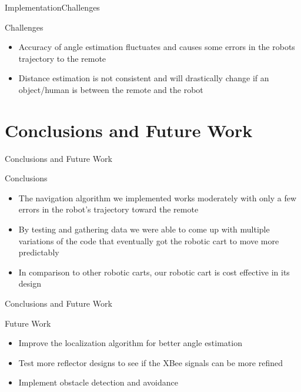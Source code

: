 \documentclass{beamer}
\begin{document}

\begin{frame}{Implementation}{Challenges}
  \begin{block}{Challenges}
    \begin{itemize}
      \item Accuracy of angle estimation fluctuates and causes some errors in the robots trajectory to the remote
      \item Distance estimation is not consistent and will drastically change if an object/human is between the remote and the robot
    \end{itemize}
  \end{block}
\end{frame}


\section{Conclusions and Future Work}

\begin{frame}{Conclusions and Future Work}
  \begin{block}{Conclusions}
    \begin{itemize}
      \item The navigation algorithm we implemented works moderately with only a few errors in the robot's trajectory toward the remote
      \item By testing and gathering data we were able to come up with multiple variations of the code that eventually got the robotic cart to move more predictably
      \item In comparison to other robotic carts, our robotic cart is cost effective in its design
    \end{itemize}
  \end{block}
\end{frame}

\begin{frame}{Conclusions and Future Work}
  \begin{block}{Future Work}
    \begin{itemize}
      \item Improve the localization algorithm for better angle estimation
      \item Test more reflector designs to see if the XBee signals can be more refined
      \item Implement obstacle detection and avoidance
    \end{itemize}
  \end{block}
\end{frame}
\end{document}
